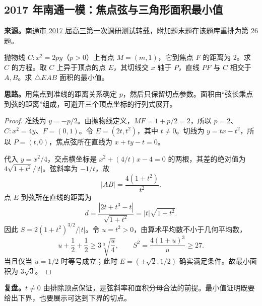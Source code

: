 \documentclass[UTF8,12pt,a4paper,fontset=fandol]{ctexart}
\begin{document}
\subsection{2017 年南通一模：焦点弦与三角形面积最小值}\label{sec:c2017nt1}
\textbf{来源。}\href{https://www.renrendoc.com/paper/202096368.html}{南通市 2017 届高三第一次调研测试转载}，附加题末题在该题库重排为第 26 题。
\begin{example}[题意]
抛物线 $C:x^2=2py$（$p>0$）上有点 $M=(m,1)$，它到焦点 $F$ 的距离为 $2$。求 $C$ 的方程。取 $C$ 上异于顶点的点 $E$，其切线交 $x$ 轴于 $P$，直线 $PF$ 与 $C$ 相交于 $A,B$。求 $\triangle EAB$ 面积的最小值。
\end{example}
\textbf{思路。}用焦点到准线的距离关系确定 $p$，然后只保留切点参数。面积由“弦长乘点到弦的距离”组成，可避开三个顶点坐标的行列式展开。
\begin{proof}
准线为 $y=-p/2$。由抛物线定义，$MF=1+p/2=2$，所以 $p=2$、$C:x^2=4y$、$F=(0,1)$。令 $E=(2t,t^2)$，其中 $t\ne0$。切线为 $y=tx-t^2$，所以 $P=(t,0)$，焦点弦所在直线为 $x+ty-t=0$。

代入 $y=x^2/4$，交点横坐标是 $x^2+(4/t)x-4=0$ 的两根，其差的绝对值为 $4\sqrt{1+t^2}/|t|$。弦斜率为 $-1/t$，故
\[
|AB|=\frac{4(1+t^2)}{t^2}.
\]
点 $E$ 到弦所在直线的距离为
\[
d=\frac{|2t+t^3-t|}{\sqrt{1+t^2}}
=|t|\sqrt{1+t^2}.
\]
因此 $S=2(1+t^2)^{3/2}/|t|$。令 $u=t^2>0$，由算术平均数不小于几何平均数，
\[
u+\frac12+\frac12\geq3\sqrt[3]{\frac u4},
\qquad S^2=\frac{4(1+u)^3}{u}\geq27.
\]
当且仅当 $u=1/2$ 时等号成立；此时 $E=(\pm\sqrt2,1/2)$ 确实满足条件。故最小面积为 $\boxed{3\sqrt3}$。
\end{proof}
\textbf{复盘。}$t\ne0$ 由排除顶点保证，是弦斜率和面积分母合法的前提。最小值证明既要给出下界，也要展示可达到下界的切点。
\end{document}
